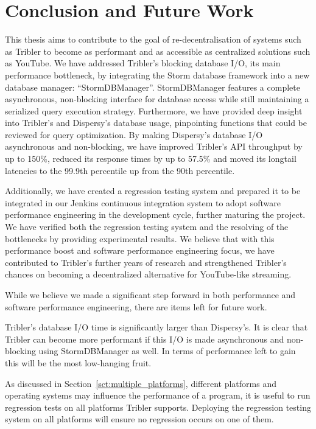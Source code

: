 \chapter{Conclusion and Future Work}
\label{cpt:conclusion_and_future_work}

This thesis aims to contribute to the goal of re-decentralisation of systems such as Tribler to become as performant and as accessible as centralized solutions such as YouTube.
We have addressed Tribler's blocking database I/O, its main performance bottleneck, by integrating the Storm database framework into a new database manager: \enquote{StormDBManager}.
StormDBManager features a complete asynchronous, non-blocking interface for database access while still maintaining a serialized query execution strategy.
Furthermore, we have provided deep insight into Tribler's and Dispersy's database usage, pinpointing functions that could be reviewed for query optimization.
By making Dispersy's database I/O asynchronous and non-blocking, we have improved Tribler's API throughput by up to 150\%, reduced its response times by up to 57.5\% and moved its longtail latencies to the 99.9th percentile up from the 90th percentile.

Additionally, we have created a regression testing system and prepared it to be integrated in our Jenkins continuous integration system to adopt software performance engineering in the development cycle, further maturing the project.
We have verified both the regression testing system and the resolving of the bottlenecks by providing experimental results.
We believe that with this performance boost and software performance engineering focus, we have contributed to Tribler's further years of research and strengthened Tribler's chances on becoming a decentralized alternative for YouTube-like streaming.

While we believe we made a significant step forward in both performance and software performance engineering, there are items left for future work.

Tribler's database I/O time is significantly larger than Dispersy's.
It is clear that Tribler can become more performant if this I/O is made asynchronous and non-blocking using StormDBManager as well.
In terms of performance left to gain this will be the most low-hanging fruit.

As discussed in Section~\ref{sct:multiple_platforms}, different platforms and operating systems may influence the performance of a program, it is useful to run regression tests on all platforms Tribler supports.
Deploying the regression testing system on all platforms will ensure no regression occurs on one of them.

